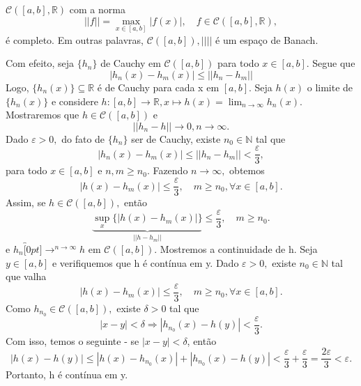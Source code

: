 \documentclass[metric_notes.tex]{subfiles}
\begin{document}
\begin{example}
	\(\mathcal{C}([a, b], \mathbb{R})\) com a norma
	\[
		||f|| = \max_{x\in [a, b]}|f(x)|,\quad f\in \mathcal{C}([a, b], \mathbb{R}),
	\]
	é completo. Em outras palavras, \(\mathcal{C}([a, b]), ||||\) é um espaço de Banach.

	Com efeito, seja \(\{h_{n}\}\) de Cauchy em \(\mathcal{C}([a, b])\) para todo \(x\in [a, b]\). Segue que
	\[
		|h_{n}(x) - h_{m}(x)|\leq ||h_{n}-h_{m}||
	\]
	Logo, \(\{h_{n}(x)\}\subseteq{\mathbb{R}}\) é de Cauchy para cada x em \([a, b]\). Seja \(h(x)\) o limite de \(\{h_{n}(x)\}\) e
	considere \(h:[a, b]\rightarrow \mathbb{R}, x\mapsto h(x) = \lim_{n\to \infty}h_{n}(x).\) Mostraremos que \(h\in \mathcal{C}([a, b])\) e
	\[
		||h_{n}-h|| \rightarrow 0, n\rightarrow \infty.
	\]
	Dado \(\varepsilon >0,\) do fato de \(\{h_{n}\}\) ser de Cauchy, existe \(n_{0}\in \mathbb{N}\) tal que
	\[
		|h_{n}(x) - h_{m}(x)|\leq ||h_{n}-h_{m}|| < \frac{\varepsilon }{3},
	\]
	para todo \(x\in[a, b]\) e \(n, m\geq n_{0}\). Fazendo \(n\longrightarrow \infty,\) obtemos
	\[
		|h(x)-h_{m}(x)|\leq \frac{\varepsilon }{3},\quad m\geq n_{0}, \forall x\in[a, b].
	\]
	Assim, se \(h\in \mathcal{C}([a, b]), \) então
	\[
		\underbrace{\sup_{x}\{|h(x) - h_{m}(x)|\}}_{||h-h_{m}||}\leq \frac{\varepsilon }{3},\quad m\geq n_{0}.
	\]
	e \(h_{n}\overbracket[0pt]{\longrightarrow}^{n\to \infty}h\) em \(\mathcal{C}([a, b]).\) Mostremos a continuidade de h.
	Seja \(y\in [a, b]\) e verifiquemos que h é contínua em y. Dado \(\varepsilon >0,\) existe \(n_{0}\in \mathbb{N}\) tal que
	valha
	\[
		|h(x)-h_{m}(x)|\leq \frac{\varepsilon }{3},\quad m\geq n_{0}, \forall x\in[a, b].
	\]
	Como \(h_{n_{0}}\in \mathcal{C}([a, b]),\) existe \(\delta > 0\) tal que
	\[
		|x-y| < \delta \Rightarrow |h_{n_{0}}(x) - h(y)| < \frac{\varepsilon }{3}.
	\]
	Com isso, temos o seguinte - se \(|x-y| < \delta \), então
	\[
		|h(x)-h(y)|\leq |h(x)-h_{n_{0}}(x)| + |h_{n_{0}}(x) - h(y)| < \frac{\varepsilon }{3} + \frac{\varepsilon }{3} = \frac{2\varepsilon }{3} < \varepsilon .
	\]
	Portanto, h é contínua em y.
\end{example}
\end{document}
